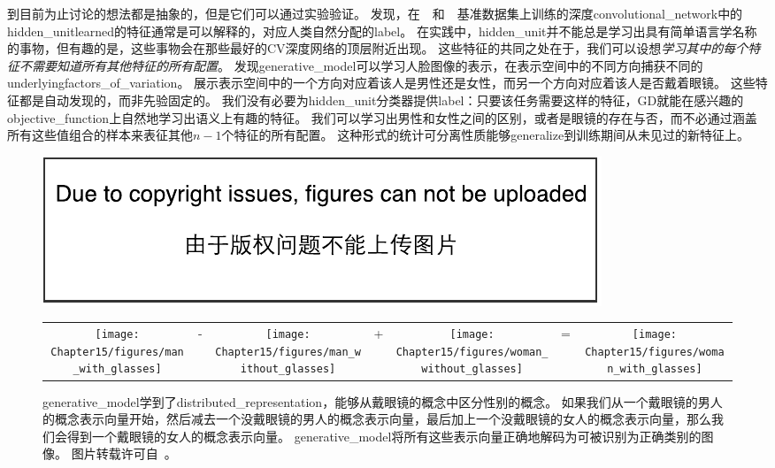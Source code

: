 
到目前为止讨论的想法都是抽象的，但是它们可以通过实验验证。
\cite{Zhou-et-al-ICLR2015}发现，在~~和~~基准数据集上训练的深度\gls{convolutional_network}中的\gls{hidden_unit}\gls{learned}的特征通常是可以解释的，对应人类自然分配的\gls{label}。
在实践中，\gls{hidden_unit}并不能总是学习出具有简单语言学名称的事物，但有趣的是，这些事物会在那些最好的\gls{CV}深度网络的顶层附近出现。
这些特征的共同之处在于，我们可以设想\emph{学习其中的每个特征不需要知道所有其他特征的所有配置}。
\cite{radford2015unsupervised}发现\gls{generative_model}可以学习人脸图像的表示，在表示空间中的不同方向捕获不同的\gls{underlying}\gls{factors_of_variation}。
展示表示空间中的一个方向对应着该人是男性还是女性，而另一个方向对应着该人是否戴着眼镜。
这些特征都是自动发现的，而非先验固定的。
我们没有必要为\gls{hidden_unit}分类器提供\gls{label}：只要该任务需要这样的特征，\gls{GD}就能在感兴趣的\gls{objective_function}上自然地学习出语义上有趣的特征。
我们可以学习出男性和女性之间的区别，或者是眼镜的存在与否，而不必通过涵盖所有这些值组合的样本来表征其他$n-1$个特征的所有配置。
这种形式的统计可分离性质能够\gls{generalize}到训练期间从未见过的新特征上。



\begin{figure}[!htb]
\ifOpenSource
\centerline{\includegraphics{figure.pdf}}
\else
\begin{tabular}{ccccccc}
\texttt{[image: Chapter15/figures/man\_with\_glasses]} &
- &
\texttt{[image: Chapter15/figures/man\_without\_glasses]} &
+ &
\texttt{[image: Chapter15/figures/woman\_without\_glasses]} &
= &
\texttt{[image: Chapter15/figures/woman\_with\_glasses]}
\end{tabular}
\fi
\caption{\gls{generative_model}学到了\gls{distributed_representation}，能够从戴眼镜的概念中区分性别的概念。
如果我们从一个戴眼镜的男人的概念表示向量开始，然后减去一个没戴眼镜的男人的概念表示向量，最后加上一个没戴眼镜的女人的概念表示向量，那么我们会得到一个戴眼镜的女人的概念表示向量。
\gls{generative_model}将所有这些表示向量正确地解码为可被识别为正确类别的图像。
图片转载许可自~\cite{radford2015unsupervised}。
}
\label{fig:chap15_generative_glasses}
\end{figure}


